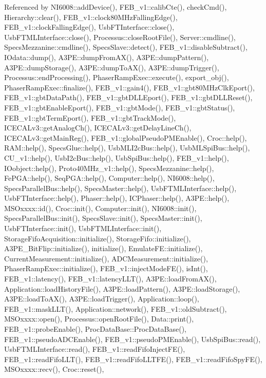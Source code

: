 Referenced by N\+I6008\+::add\+Device(), F\+E\+B\+\_\+v1\+::calib\+Cte(), check\+Cmd(), Hierarchy\+::clear(), F\+E\+B\+\_\+v1\+::clock80\+M\+Hz\+Falling\+Edge(), F\+E\+B\+\_\+v1\+::clock\+Falling\+Edge(), Usb\+F\+T\+Interface\+::close(), Usb\+F\+T\+M\+L\+Interface\+::close(), Processus\+::close\+Root\+File(), Server\+::cmdline(), Specs\+Mezzanine\+::cmdline(), Specs\+Slave\+::detect(), F\+E\+B\+\_\+v1\+::disable\+Subtract(), I\+Odata\+::dump(), A3\+P\+E\+::dump\+From\+A\+X(), A3\+P\+E\+::dump\+Pattern(), A3\+P\+E\+::dump\+Storage(), A3\+P\+E\+::dump\+To\+A\+X(), A3\+P\+E\+::dump\+Trigger(), Processus\+::end\+Processing(), Phaser\+Ramp\+Exec\+::execute(), export\+\_\+obj(), Phaser\+Ramp\+Exec\+::finalize(), F\+E\+B\+\_\+v1\+::gain4(), F\+E\+B\+\_\+v1\+::gbt80\+M\+Hz\+Clk\+Eport(), F\+E\+B\+\_\+v1\+::gbt\+Data\+Path(), F\+E\+B\+\_\+v1\+::gbt\+D\+L\+L\+Eport(), F\+E\+B\+\_\+v1\+::gbt\+D\+L\+L\+Reset(), F\+E\+B\+\_\+v1\+::gbt\+Enable\+Eport(), F\+E\+B\+\_\+v1\+::gbt\+Mode(), F\+E\+B\+\_\+v1\+::gbt\+Status(), F\+E\+B\+\_\+v1\+::gbt\+Term\+Eport(), F\+E\+B\+\_\+v1\+::gbt\+Track\+Mode(), I\+C\+E\+C\+A\+Lv3\+::get\+Analog\+Ch(), I\+C\+E\+C\+A\+Lv3\+::get\+Delay\+Line\+Ch(), I\+C\+E\+C\+A\+Lv3\+::get\+Main\+Reg(), F\+E\+B\+\_\+v1\+::global\+Pseudo\+P\+M\+Enable(), Croc\+::help(), R\+A\+M\+::help(), Specs\+Glue\+::help(), Usb\+M\+L\+I2c\+Bus\+::help(), Usb\+M\+L\+Spi\+Bus\+::help(), C\+U\+\_\+v1\+::help(), Usb\+I2c\+Bus\+::help(), Usb\+Spi\+Bus\+::help(), F\+E\+B\+\_\+v1\+::help(), I\+Oobject\+::help(), Proto40\+M\+Hz\+\_\+v1\+::help(), Specs\+Mezzanine\+::help(), Fe\+P\+G\+A\+::help(), Seq\+P\+G\+A\+::help(), Computer\+::help(), N\+I6008\+::help(), Specs\+Parallel\+Bus\+::help(), Specs\+Master\+::help(), Usb\+F\+T\+M\+L\+Interface\+::help(), Usb\+F\+T\+Interface\+::help(), Phaser\+::help(), I\+C\+Phaser\+::help(), A3\+P\+E\+::help(), M\+S\+Oxxxx\+::id(), Croc\+::init(), Computer\+::init(), N\+I6008\+::init(), Specs\+Parallel\+Bus\+::init(), Specs\+Slave\+::init(), Specs\+Master\+::init(), Usb\+F\+T\+Interface\+::init(), Usb\+F\+T\+M\+L\+Interface\+::init(), Storage\+Fifo\+Acquisition\+::initialize(), Storage\+Fifo\+::initialize(), A3\+P\+E\+\_\+\+Bit\+Flip\+::initialize(), initialize(), Emulate\+F\+E\+::initialize(), Current\+Measurement\+::initialize(), A\+D\+C\+Measurement\+::initialize(), Phaser\+Ramp\+Exec\+::initialize(), F\+E\+B\+\_\+v1\+::inject\+Mode\+F\+E(), is\+Int(), F\+E\+B\+\_\+v1\+::latency(), F\+E\+B\+\_\+v1\+::latency\+L\+L\+T(), A3\+P\+E\+::load\+From\+A\+X(), Application\+::load\+History\+File(), A3\+P\+E\+::load\+Pattern(), A3\+P\+E\+::load\+Storage(), A3\+P\+E\+::load\+To\+A\+X(), A3\+P\+E\+::load\+Trigger(), Application\+::loop(), F\+E\+B\+\_\+v1\+::mask\+L\+L\+T(), Application\+::network(), F\+E\+B\+\_\+v1\+::old\+Subtract(), M\+S\+Oxxxx\+::open(), Processus\+::open\+Root\+File(), Data\+::print(), F\+E\+B\+\_\+v1\+::probe\+Enable(), Proc\+Data\+Base\+::\+Proc\+Data\+Base(), F\+E\+B\+\_\+v1\+::pseudo\+A\+D\+C\+Enable(), F\+E\+B\+\_\+v1\+::pseudo\+P\+M\+Enable(), Usb\+Spi\+Bus\+::read(), Usb\+F\+T\+M\+L\+Interface\+::read(), F\+E\+B\+\_\+v1\+::read\+Fifo\+Inject\+F\+E(), F\+E\+B\+\_\+v1\+::read\+Fifo\+L\+L\+T(), F\+E\+B\+\_\+v1\+::read\+Fifo\+L\+L\+T\+F\+E(), F\+E\+B\+\_\+v1\+::read\+Fifo\+Spy\+F\+E(), M\+S\+Oxxxx\+::recv(), Croc\+::reset(), 